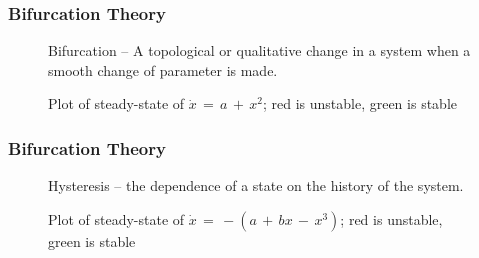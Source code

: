 \documentclass[10pt]{beamer}
\begin{document}
\begin{frame} %
\frametitle{Bifurcation Theory}
\begin{figure}[h]
\begin{minipage}{0.49\linewidth}
	\centering
\end{minipage}
\begin{minipage}{0.49\linewidth}
	Bifurcation -- A topological or qualitative change in a system when a smooth change of parameter is made. \vspace*{5mm}
	\caption{Plot of steady-state of $\dot{x} \,=\, a \,+\, x^2$; red is unstable, green is stable}
\end{minipage}
\end{figure}

\end{frame}


\begin{frame} %
\frametitle{Bifurcation Theory}
\begin{figure}[h]
\begin{minipage}{0.49\linewidth}
	\centering
\end{minipage}
\begin{minipage}{0.49\linewidth}
	Hysteresis -- the dependence of a state on the history of the system. \vspace*{5mm}
	\caption{Plot of steady-state of $\dot{x} \,=\, -(a \,+\, bx \,-\, x^3)$; red is unstable, green is stable}
\end{minipage}
\end{figure}
\end{frame}

\end{document}
